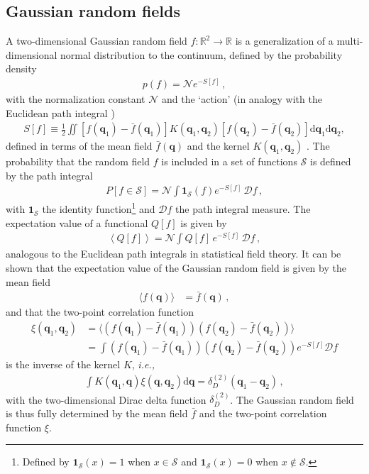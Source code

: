 \documentclass[a4paper, 11pt]{article}
\begin{document}
\subsection{Gaussian random fields}
A two-dimensional Gaussian random field $f:\mathbb{R}^2\to \mathbb{R}$ is a generalization of a multi-dimensional normal distribution to the continuum, defined by the probability density
\begin{align}
p(f) = \mathcal{N} e^{- S[f]}\,, \label{eq:functional_Distribution}
\end{align}
with the normalization constant $\mathcal{N}$ and the `action' (in analogy with the Euclidean path integral \cite{Feynman:1965})
\begin{align}
S[f]\equiv \frac{1}{2} \iint [f(\bm{q}_1) - \bar{f}(\bm{q}_1)] K(\bm{q}_1,\bm{q}_2) [f(\bm{q}_2) -\bar{f}(\bm{q}_2)]\mathrm{d}\bm{q}_1 \mathrm{d}\bm{q}_2,\label{eq:action}
\end{align}
defined in terms of the mean field $\bar{f}(\bm{q})$ and the kernel $K(\bm{q}_1,\bm{q}_2)$ \cite{Longuet-Higgins:1957, Adler:1981, bbks:1986}. The probability that the random field $f$ is included in a set of functions $\mathcal{S}$ is defined by the path integral
\begin{align}
P[f \in \mathcal{S}] = \mathcal{N} \int \bm{1}_\mathcal{S}(f) e^{-S[f]}\,\mathcal{D}f\,,
\end{align}
with $\bm{1}_\mathcal{S}$ the identity function\footnote{Defined by $\bm{1}_\mathcal{S}(x)=1$ when $x \in \mathcal{S}$ and $\bm{1}_\mathcal{S}(x)=0$ when $x \notin \mathcal{S}$.} and $\mathcal{D}f$ the path integral measure. The expectation value of a functional $Q[f]$ is given by
\begin{align}
\left\langle Q[f] \right\rangle = \mathcal{N}\int Q[f]\, e^{-S[f]}\,\mathcal{D}f\,,
\end{align}
analogous to the Euclidean path integrals in statistical field theory. It can be shown that the expectation value of the Gaussian random field is given by the mean field
\begin{align}
\langle f(\bm{q})\rangle &= \bar{f}(\bm{q})\,,
\end{align}
and that the two-point correlation function
\begin{align}
\xi(\bm{q}_1, \bm{q}_2) &= \langle (f(\bm{q}_1) - \bar{f}(\bm{q}_1)) (f(\bm{q}_2) - \bar{f}(\bm{q}_2))\rangle\nonumber\\
&= \int (f(\bm{q}_1) - \bar{f}(\bm{q}_1)) (f(\bm{q}_2) - \bar{f}(\bm{q}_2)) e^{-S[f]}\mathcal{D}f
\end{align}
is the inverse of the kernel $K$, \textit{i.e.,}
\begin{align}
\int K(\bm{q}_1,\bm{q}) \xi(\bm{q},\bm{q}_2) \mathrm{d}\bm{q}= \delta_D^{(2)}(\bm{q}_1-\bm{q}_2)\,,\label{eq:defK}
\end{align}
with the two-dimensional Dirac delta function $\delta_D^{(2)}$. The Gaussian random field is thus fully determined by the mean field $\bar{f}$ and the two-point correlation function $\xi$. 
\end{document}
